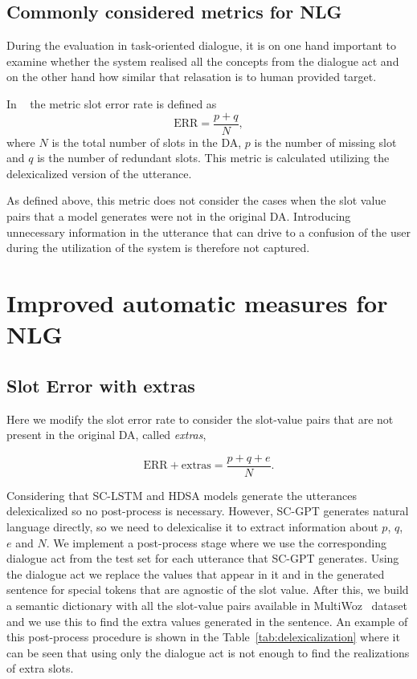\documentclass[11pt]{article}
\begin{document}
\subsection{Commonly considered metrics for NLG} \label{slot_error}
During the evaluation in task-oriented dialogue, it is on one hand important to examine whether the system realised all the concepts from the dialogue act and on the other hand how similar that relasation is to human provided target. 

In ~\cite{wen-etal-2015-semantically} the metric slot error rate is defined as  
$$
\mathrm{ERR}=\frac{p+q}{N},
$$
where $N$ is the total number of slots in the DA, $p$ is the number of missing slot and $q$ is the number of redundant slots. This metric is calculated utilizing the delexicalized version of the utterance.

As defined above, this metric does not consider the cases when the slot value pairs that a model generates were not in the original DA. Introducing unnecessary information in the utterance that can drive to a confusion of the user during the utilization of the system is therefore not captured.


\section{Improved automatic measures for NLG}
\subsection{Slot Error with extras} \label{new_slot_error}
Here we modify the slot error rate to consider the slot-value pairs that are not present in the original DA, called \emph{extras},

$$\mathrm{ERR+extras}=\frac{p+q+e}{N}.$$

Considering that SC-LSTM and HDSA models generate the utterances delexicalized so no post-process is necessary. However, SC-GPT generates natural language directly, so we need to delexicalise it to extract information about $p$, $q$, $e$ and $N$.  We implement a post-process stage where we use the corresponding dialogue act from the test set for each utterance that SC-GPT generates. Using the dialogue act we replace the values that appear in it and in the generated sentence for special tokens that are agnostic of the slot value. After this, we build a semantic dictionary with all the slot-value pairs available in MultiWoz~\cite{budzianowski-etal-2018-multiwoz} dataset and we use this to find the extra values generated in the sentence. An example of this post-process procedure is shown in the Table~\ref{tab:delexicalization} where it can be seen that using only the dialogue act is not enough to find the realizations of extra slots.
\end{document}
